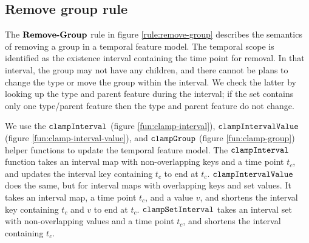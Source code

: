 \subsection{Remove group rule}
\label{sub:remove-group-rule}
The $\textbf{Remove-Group}$ rule in figure \ref{rule:remove-group} describes the semantics of removing a group in a temporal feature model. The temporal scope is identified as the existence interval containing the time point for removal. In that interval, the group may not have any children, and there cannot be plans to change the type or move the group within the interval. We check the latter by looking up the type and parent feature during the interval; if the set contains only one type/parent feature then the type and parent feature do not change. 

We use the $\texttt{clampInterval}$ (figure \vref{fun:clamp-interval}), $\texttt{clampIntervalValue}$ (figure \vref{fun:clamp-interval-value}), and $\texttt{clampGroup}$ (figure \vref{fun:clamp-group}) helper functions to update the temporal feature model.  The $\texttt{clampInterval}$ function takes an interval map with non-overlapping keys and a time point $t_c$, and updates the interval key containing $t_c$ to end at $t_c$. $\texttt{clampIntervalValue}$ does the same, but for interval maps with overlapping keys and set values. It takes an interval map, a time point $t_c$, and a value $v$, and shortens the interval key containing $t_c$ and $v$ to end at $t_c$. $\texttt{clampSetInterval}$ takes an interval set with non-overlapping values and a time point $t_c$, and shortens the interval containing $t_c$. 


